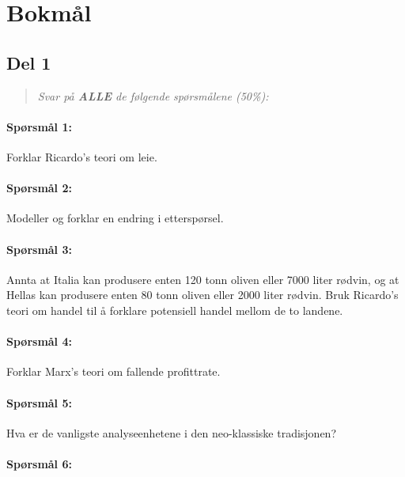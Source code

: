 \documentclass[a4paper,12pt,fleqn]{article}
\begin{document}
\clearpage

\section*{Bokmål}
\subsection*{Del 1}

\begin{quote}
	\textit{Svar på \textbf{ALLE} de følgende spørsmålene (50\%): }
\end{quote}

\paragraph{\textbf{Spørsmål 1:}}

Forklar Ricardo's teori om leie.

\paragraph{\textbf{Spørsmål 2:}}

Modeller og forklar en endring i etterspørsel.

\paragraph{\textbf{Spørsmål 3:}}

Annta at Italia kan produsere enten 120 tonn oliven eller 7000 liter rødvin, og
at Hellas kan produsere enten 80 tonn oliven eller 2000 liter rødvin. Bruk
Ricardo's teori om handel til å forklare potensiell handel mellom de to landene.

\paragraph{\textbf{Spørsmål 4:}}

Forklar Marx's teori om fallende profittrate.

\paragraph{\textbf{Spørsmål 5:}}

Hva er de vanligste analyseenhetene i den neo-klassiske tradisjonen?

\paragraph{\textbf{Spørsmål 6:}}
\end{document}
